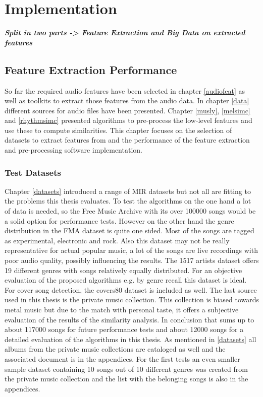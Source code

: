 
\chapter{Implementation}

\textit{\textbf{Split in two parts -> Feature Extraction and Big Data on extracted features}}

\section{Feature Extraction Performance}\label{simmet}

So far the required audio features have been selected in chapter \ref{audiofeat} as well as toolkits to extract those features from the audio data.
In chapter \ref{data} different sources for audio files have been presented. Chapter \ref{musly}, \ref{melsimc} and \ref{rhythmsimc} presented algorithms to pre-process the low-level features and use these to compute similarities. 
This chapter focuses on the selection of datasets to extract features from and the performance of the feature extraction and pre-processing software implementation.  

\subsection{Test Datasets}

Chapter \ref{datasets} introduced a range of MIR datasets but not all are fitting to the problems this thesis evaluates. To test the algorithms on the one hand a lot of data is needed, so the Free Music Archive with its over 100000 songs would be a solid option for performance tests. However on the other hand the genre distribution in the FMA dataset is quite one sided. Most of the songs are tagged as experimental, electronic and rock. Also this dataset may not be really representative for actual popular music, a lot of the songs are live recordings with poor audio quality, possibly influencing the results.
The 1517 artists dataset offers 19 different genres with songs relatively equally distributed. For an objective evaluation of the proposed algorithms e.g. by genre recall this dataset is ideal. For cover song detection, the covers80 dataset is included as well.
The last source used in this thesis is the private music collection. This collection is biased towards metal music but due to the match with personal taste, it offers a subjective evaluation of the results of the similarity analysis. 
In conclusion that sums up to about 117000 songs for future performance tests and about 12000 songs for a detailed evaluation of the algorithms in this thesis. As mentioned in \ref{datasets} all albums from the private music collections are cataloged as well and the associated document is in the appendices. For the first tests an even smaller sample dataset containing 10 songs out of 10 different genres was created from the private music collection and the list with the belonging songs is also in the appendices.

